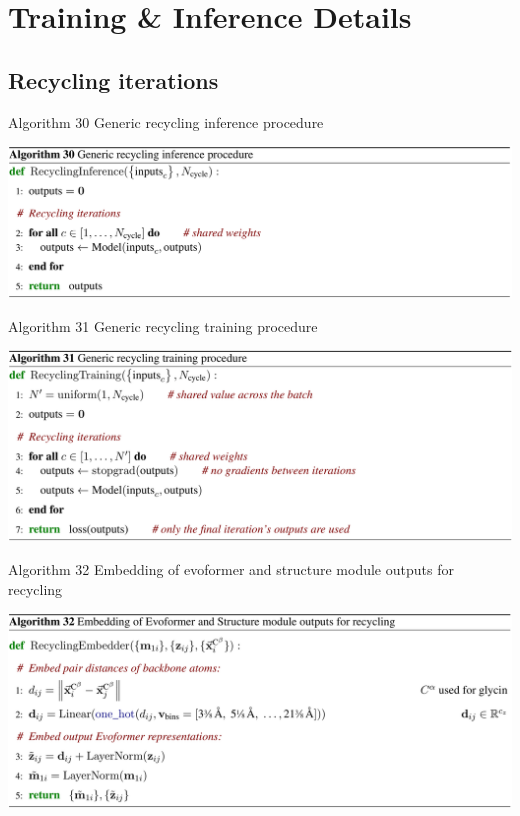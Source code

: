 \documentclass[presentation, smaller]{beamer}
\begin{document}
\section*{Training \& Inference Details}
\label{sec:org7a1f6c5}
\subsection*{Recycling iterations}
\label{sec:org2a127e8}
\begin{frame}[label={sec:org6cd0269}]{Algorithm 30 Generic recycling inference procedure \cite{jumperHighlyAccurateProtein2021}}
\begin{center}
\includegraphics[width=.9\linewidth]{./imgs/algo30_recycling.png}
\end{center}
\end{frame}
\begin{frame}[label={sec:org2ebc932}]{Algorithm 31 Generic recycling training procedure \cite{jumperHighlyAccurateProtein2021}}
\begin{center}
\includegraphics[width=.9\linewidth]{./imgs/algo31_generic-recycling.png}
\end{center}
\end{frame}
\begin{frame}[label={sec:orgd628978}]{Algorithm 32 Embedding of evoformer and structure module outputs for recycling \cite{jumperHighlyAccurateProtein2021}}
\begin{center}
\includegraphics[width=.9\linewidth]{./imgs/algo32_recycling-embedding.png}
\end{center}
\end{frame}
\end{document}
